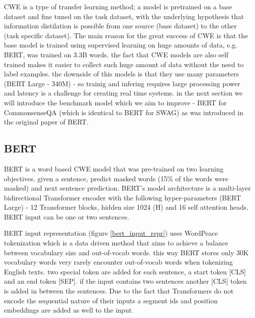 \documentclass{article}
\begin{document}
CWE is a type of transfer learning method; a model is pretrained on a base dataset and fine tuned on the task dataset,  with the underlying hypothesis that information distilation is possible from one source (base dataset) to the other (task specific dataset).
The main reason for the great success of CWE is that the base model is trained using supervised learning on huge amounts of data, e.g. BERT, was trained on 3.3B words. the fact that CWE models are also self trained makes it easier to collect such huge amount of data without the need to label examples. the downside of this models is that they use many parameters (BERT Large - 340M) - so trainig and infering requires large processing power and latency is a challenge for creating real time systems. in the next section we will introduce the benchmark model which we aim to improve - BERT for CommonsenseQA (which is identical to BERT for SWAG) as was introduced in the original paper of BERT.

\subsection{BERT}
BERT is a word based CWE model that was pre-trained on two learning objectives. given a sentence, predict masked words (15\% of the words were masked) and next sentence prediction. BERT’s  model  architecture is a multi-layer bidirectional Transformer encoder \cite{vaswani2017attention} with the following hyper-parameters (BERT Large) - 12 Transformer blocks, hidden size 1024 (H) and 16 self attention heads. BERT input can be one or two sentences.

BERT input representation (figure \ref{bert_input_repr}) uses WordPeace \cite{wu2016google} tokenization which is a data driven method that aims to achieve a balance between vocabulary size and out-of-vocab words. this way BERT stores only 30K vocabulary words very rarely encounter out-of-vocab words when tokenizing English texts. two special token are added for each sentence, a start token [CLS] and an end token [SEP]. if the input contains two sentences another [CLS] token is added in between the sentences. Due to the fact that Transformers do not encode the sequential nature of their inputs a segment ids and position embeddings are added as well to the input.
\end{document}
